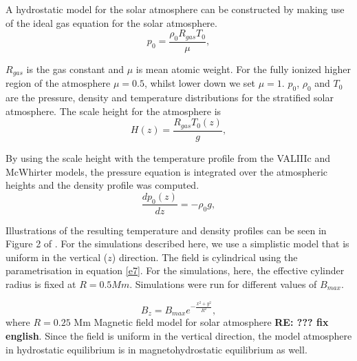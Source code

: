 \documentclass{aastex62}
\begin{document}
A hydrostatic model for the solar atmosphere can be constructed by making use of the ideal gas equation for the solar atmosphere.
\begin{equation}
p_{0}=\frac{\rho_{0}R_{gas}T_{0}}{\mu}  , \label{e8}
\end{equation}

$R_{gas}$ is the gas constant and $\mu$ is mean atomic weight. For the fully ionized higher region of the atmosphere $\mu=0.5$, whilst lower down we set $\mu=1$. $p_{0}$, $\rho_{0}$ and $T_{0}$ are the pressure, density and temperature distributions for the stratified solar atmosphere. The scale height for the atmosphere is
\begin{equation}
H(z)=\frac{R_{gas}T_{0}(z)}{g}  , \label{e10}
\end{equation}

By using the scale height with the temperature profile from the VALIIIc and McWhirter models, the pressure equation is integrated over the atmospheric heights and the density profile was computed.
\begin{equation}
\frac{dp_{0}(z)}{dz}=-\rho_{0}g   , \label{e9}
\end{equation}

Illustrations of the resulting temperature and density profiles can be seen in Figure 2 of \citet{Griffiths2018}. For the simulations described here, we use a simplistic model that is uniform in the vertical ($z$) direction. The field is cylindrical using the parametrisation in equation \ref{e7}. For the simulations, here, the effective cylinder radius is fixed at $R=0.5Mm$. Simulations were run for different values of $B_{max}$.

\begin{equation}
B_{z}=B_{max} e^{-\frac{x^2+y^2}{R^2}}, 
\label{e7}
\end{equation}
where $R=0.25$ Mm Magnetic field model for solar atmosphere {\bf RE: ??? fix english}. Since the field is uniform in the vertical direction, the model atmosphere in hydrostatic equilibrium is in magnetohydrostatic equilibrium as well.
\end{document}
